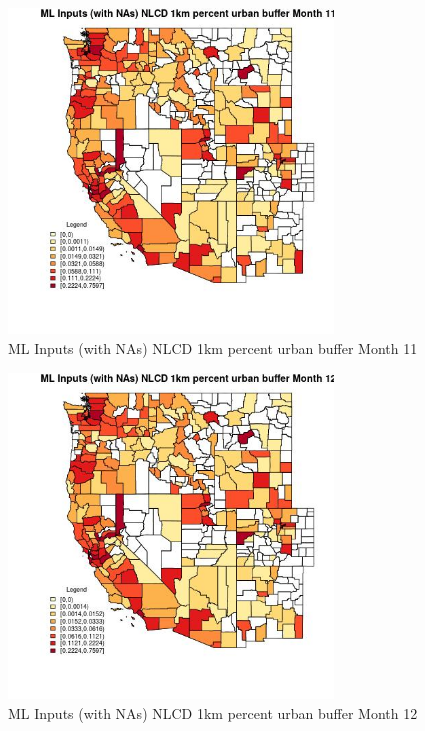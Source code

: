 \begin{figure} 
\centering  
\includegraphics[width=0.77\textwidth]{Code_Outputs/Report_ML_input_PM25_Step4_part_e_de_duplicated_aves_compiled_2019-05-21wNAs_CountyNLCD_1km_percent_urban_buffermedianMonth11.jpg} 
\caption{\label{fig:Report_ML_input_PM25_Step4_part_e_de_duplicated_aves_compiled_2019-05-21wNAsCountyNLCD_1km_percent_urban_buffermedianMonth11}ML Inputs (with NAs) NLCD 1km percent urban buffer Month 11} 
\end{figure} 
 

\begin{figure} 
\centering  
\includegraphics[width=0.77\textwidth]{Code_Outputs/Report_ML_input_PM25_Step4_part_e_de_duplicated_aves_compiled_2019-05-21wNAs_CountyNLCD_1km_percent_urban_buffermedianMonth12.jpg} 
\caption{\label{fig:Report_ML_input_PM25_Step4_part_e_de_duplicated_aves_compiled_2019-05-21wNAsCountyNLCD_1km_percent_urban_buffermedianMonth12}ML Inputs (with NAs) NLCD 1km percent urban buffer Month 12} 
\end{figure} 
 

